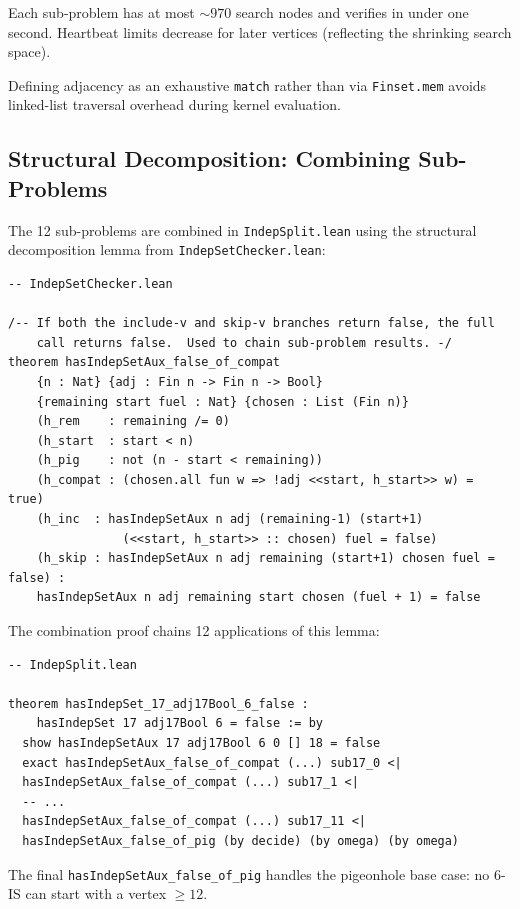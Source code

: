 \documentclass[11pt]{article}
\newcommand{\lean}[1]{\texttt{#1}}
\begin{document}
\noindent
Each sub-problem has at most $\sim\!970$ search nodes and verifies in under
one second.
Heartbeat limits decrease for later vertices (reflecting the shrinking
search space).

Defining adjacency as an exhaustive \lean{match} rather than via
\lean{Finset.mem} avoids linked-list traversal overhead during kernel
evaluation.

\subsection{Structural Decomposition: Combining Sub-Problems}
\label{sec:checker:decomp}

The 12 sub-problems are combined in \texttt{IndepSplit.lean} using the
structural decomposition lemma from \texttt{IndepSetChecker.lean}:

\begin{lstlisting}
-- IndepSetChecker.lean

/-- If both the include-v and skip-v branches return false, the full
    call returns false.  Used to chain sub-problem results. -/
theorem hasIndepSetAux_false_of_compat
    {n : Nat} {adj : Fin n -> Fin n -> Bool}
    {remaining start fuel : Nat} {chosen : List (Fin n)}
    (h_rem    : remaining /= 0)
    (h_start  : start < n)
    (h_pig    : not (n - start < remaining))
    (h_compat : (chosen.all fun w => !adj <<start, h_start>> w) = true)
    (h_inc  : hasIndepSetAux n adj (remaining-1) (start+1)
                (<<start, h_start>> :: chosen) fuel = false)
    (h_skip : hasIndepSetAux n adj remaining (start+1) chosen fuel = false) :
    hasIndepSetAux n adj remaining start chosen (fuel + 1) = false
\end{lstlisting}

\noindent
The combination proof chains 12 applications of this lemma:

\begin{lstlisting}
-- IndepSplit.lean

theorem hasIndepSet_17_adj17Bool_6_false :
    hasIndepSet 17 adj17Bool 6 = false := by
  show hasIndepSetAux 17 adj17Bool 6 0 [] 18 = false
  exact hasIndepSetAux_false_of_compat (...) sub17_0 <|
  hasIndepSetAux_false_of_compat (...) sub17_1 <|
  -- ...
  hasIndepSetAux_false_of_compat (...) sub17_11 <|
  hasIndepSetAux_false_of_pig (by decide) (by omega) (by omega)
\end{lstlisting}

\noindent
The final \lean{hasIndepSetAux\_false\_of\_pig} handles the pigeonhole base
case: no 6-IS can start with a vertex $\geq 12$.
\end{document}
